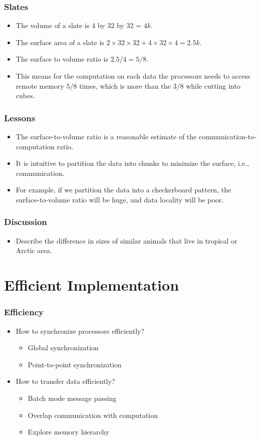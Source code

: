 \documentclass{beamer}
\begin{document}
\begin{CJK}{UTF8}{bsmi}
\begin{frame}
\frametitle{Slates}
\begin{itemize}
\item The volume of a slate is 4 by 32 by 32 = $4k$.
\item The surface area of a slate is $2 \times 32 \times 32 + 4 \times
  32 \times 4 = 2.5k$.
\item The surface to volume ratio is $2.5/4 = 5/8$.
\item This means for the computation on each data the processors needs
  to access remote memory $5/8$ times, which is more than the $3/8$
  while cutting into cubes.
\end{itemize}
\end{frame}

\begin{frame}
\frametitle{Lessons}
\begin{itemize}
\item The surface-to-volume ratio is a reasonable estimate of the communication-to-computation ratio.
\item It is intuitive to partition the data into chunks to minimize the surface, i.e., communication.  
\item For example, if we partition the data into a checkerboard pattern, the surface-to-volume ratio will be huge, and data locality will be poor.
\end{itemize}
\end{frame}


\begin{frame}
\frametitle{Discussion}
\begin{itemize}
\item Describe the difference in sizes of similar animals that live in tropical or Arctic area.
\end{itemize}
\end{frame}

\section{Efficient Implementation}

\begin{frame}
\frametitle{Efficiency}
\begin{itemize}
\item How to synchronize processors efficiently?
\begin{itemize}
\item Global synchronization
\item Point-to-point synchronization
\end{itemize}
\item How to transfer data efficiently?
\begin{itemize}
\item Batch mode message passing
\item Overlap communication with computation
\item Explore memory hierarchy
\end{itemize}
\end{itemize}
\end{frame}


\end{CJK}
\end{document}
